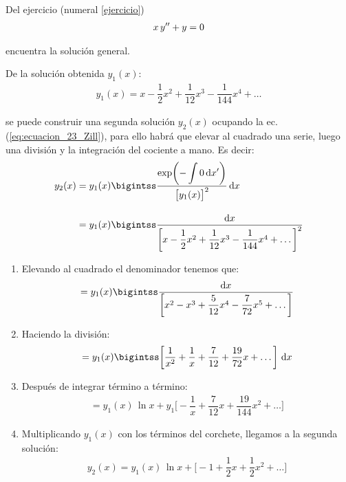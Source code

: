 Del ejercicio (numeral \ref{ejercicio})
\begin{align*}
x \, {y}^{\prime \prime} + y = 0
\end{align*}

encuentra la solución general.
\par
De la solución obtenida $y_{1}(x)$:
\begin{align*}
y_{1}(x) = x - \dfrac{1}{2} x^{2} + \dfrac{1}{12} x^{3} - \dfrac{1}{144} x^{4}  + \ldots
\end{align*}

se puede construir una segunda solución $y_{2}(x)$ ocupando la ec. (\ref{eq:ecuacion_23_Zill}), para ello habrá que elevar al cuadrado una serie, luego una división y la integración del cociente a mano. Es decir:
\begin{align*}
y_{2}(x) &= y_{1}(x) \bigintss \dfrac{\exp(\displaystyle -\int 0 \dd{x'})}{\big[ y_{1}(x) \big]^{2}} \dd{x} \\[1em]
&= y_{1} (x) \bigintss \dfrac{\dd{x}}{\bigg[ x - \dfrac{1}{2} x^{2} + \dfrac{1}{12} x^{3} - \dfrac{1}{144} x^{4}  + \ldots \bigg]^{2}} 
\end{align*}
\begin{enumerate}[label=\alph*)]
\item Elevando al cuadrado el denominador tenemos que:
\begin{align*}
= y_{1} (x) \bigintss \dfrac{\dd{x}}{\bigg[ x^{2} - x^{3} + \dfrac{5}{12} x^{4} - \dfrac{7}{72} x^{5}  + \ldots \bigg]} 
\end{align*}
\item Haciendo la división:
\begin{align*}
= y_{1} (x) \bigintss \bigg[ \dfrac{1}{x^{2}} + \dfrac{1}{x} + \dfrac{7}{12} + \dfrac{19}{72} x  + \ldots \bigg] \, \dd{x}
\end{align*}
\item Después de integrar término a término:
\begin{align*}
= y_{1} (x) \, \ln x + y_{1} \bigg[ - \dfrac{1}{x} + \dfrac{7}{12} x + \dfrac{19}{144} x^{2}  + \ldots \bigg]
\end{align*}
\item Multiplicando $y_{1}(x)$ con los términos del corchete, llegamos a la segunda solución:
\begin{align*}
y_{2} (x) = y_{1} (x) \, \ln x + \bigg[ - 1 + \dfrac{1}{2} x + \dfrac{1}{2} x^{2}  + \ldots \bigg]
\end{align*}
\end{enumerate}


